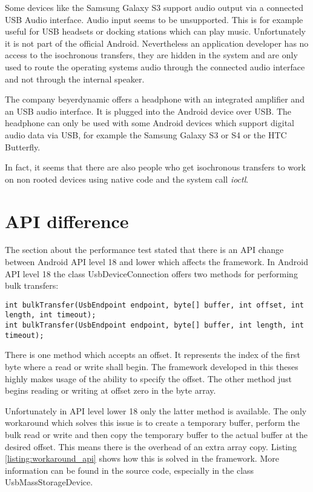 Some devices like the Samsung Galaxy S3 support audio output via a connected USB Audio interface. Audio input seems to be unsupported. This is for example useful for USB headsets or docking stations which can play music. Unfortunately it is not part of the official Android. Nevertheless an application developer has no access to the isochronous transfers, they are hidden in the system and are only used to route the operating systems audio through the connected audio interface and not through the internal speaker.

The company beyerdynamic offers a headphone with an integrated amplifier and an USB audio interface. It is plugged into the Android device over USB. The headphone can only be used with some Android devices which support digital audio data via USB, for example the Samsung Galaxy S3 or S4 or the HTC Butterfly\cite{beyerdynamic}.

In fact, it seems that there are also people who get isochronous transfers to work on non rooted devices using native code and the system call \textit{ioctl}\cite{usb_audio_recorder, iso_stack}.

\chapter{API difference}
\label{chapter:api_diff}

The section about the performance test stated that there is an API change between Android API level 18 and lower which affects the framework. In Android API level 18 the class UsbDeviceConnection offers two methods for performing bulk transfers\cite{android_usb_dev_con}:

\lstset{language=Java}
\begin{lstlisting}[caption=Bulk transfers in UsbDeviceConnection, label=listing:wifi_connectg]
int bulkTransfer(UsbEndpoint endpoint, byte[] buffer, int offset, int length, int timeout);
int bulkTransfer(UsbEndpoint endpoint, byte[] buffer, int length, int timeout);
\end{lstlisting}

There is one method which accepts an offset. It represents the index of the first byte where a read or write shall begin. The framework developed in this theses highly makes usage of the ability to specify the offset. The other method just begins reading or writing at offset zero in the byte array.

Unfortunately in API level lower 18 only the latter method is available. The only workaround which solves this issue is to create a temporary buffer, perform the bulk read or write and then copy the temporary buffer to the actual buffer at the desired offset. This means there is the overhead of an extra array copy. Listing \ref{listing:workaround_api} shows how this is solved in the framework. More information can be found in the source code, especially in the class UsbMassStorageDevice.

